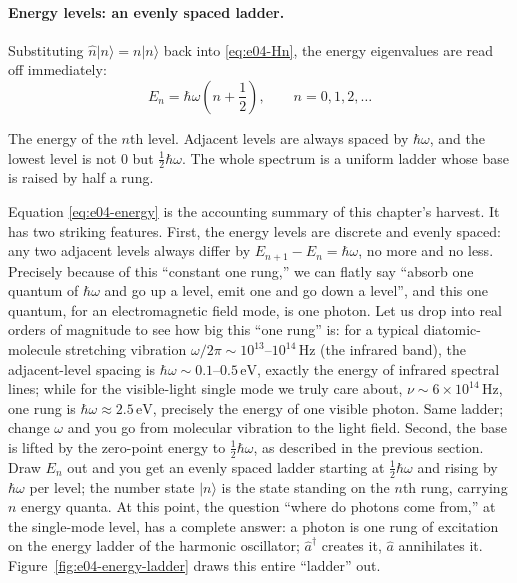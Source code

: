 \paragraph{Energy levels: an evenly spaced ladder.}
Substituting \(\hat n|n\rangle=n|n\rangle\) back into \eqref{eq:e04-Hn}, the energy eigenvalues are read off immediately:
\begin{equation}
  E_n=\hbar\omega\left(n+\frac12\right),\qquad n=0,1,2,\ldots
  \label{eq:e04-energy}
\end{equation}
\begin{formulaexplain}
The energy of the \(n\)th level. Adjacent levels are always spaced by \(\hbar\omega\), and the lowest level is not 0 but \(\tfrac12\hbar\omega\). The whole spectrum is a uniform ladder whose base is raised by half a rung.
\end{formulaexplain}
Equation \eqref{eq:e04-energy} is the accounting summary of this chapter's harvest. It has two striking features. First, the energy levels are discrete and evenly spaced: any two adjacent levels always differ by \(E_{n+1}-E_n=\hbar\omega\), no more and no less. Precisely because of this ``constant one rung,'' we can flatly say ``absorb one quantum of \(\hbar\omega\) and go up a level, emit one and go down a level'', and this one quantum, for an electromagnetic field mode, is one photon. Let us drop into real orders of magnitude to see how big this ``one rung'' is: for a typical diatomic-molecule stretching vibration \(\omega/2\pi\sim10^{13}\text{--}10^{14}\,\mathrm{Hz}\) (the infrared band), the adjacent-level spacing is \(\hbar\omega\sim0.1\text{--}0.5\,\mathrm{eV}\), exactly the energy of infrared spectral lines; while for the visible-light single mode we truly care about, \(\nu\sim6\times10^{14}\,\mathrm{Hz}\), one rung is \(\hbar\omega\approx2.5\,\mathrm{eV}\), precisely the energy of one visible photon. Same ladder; change \(\omega\) and you go from molecular vibration to the light field. Second, the base is lifted by the zero-point energy to \(\tfrac12\hbar\omega\), as described in the previous section. Draw \(E_n\) out and you get an evenly spaced ladder starting at \(\tfrac12\hbar\omega\) and rising by \(\hbar\omega\) per level; the number state \(|n\rangle\) is the state standing on the \(n\)th rung, carrying \(n\) energy quanta. At this point, the question ``where do photons come from,'' at the single-mode level, has a complete answer: a photon is one rung of excitation on the energy ladder of the harmonic oscillator; \(\hat a^\dagger\) creates it, \(\hat a\) annihilates it. Figure~\ref{fig:e04-energy-ladder} draws this entire ``ladder'' out.

